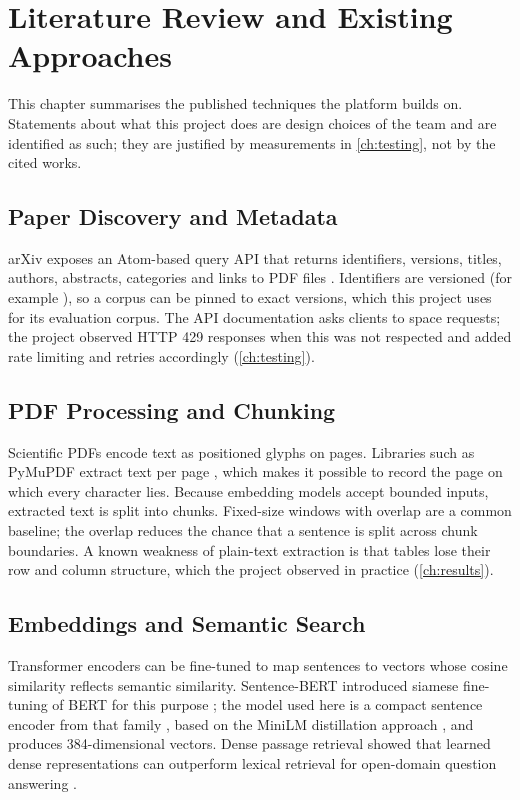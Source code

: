 \chapter{Literature Review and Existing Approaches}\label{ch:litreview}

This chapter summarises the published techniques the platform builds on. Statements about what this project does
are design choices of the team and are identified as such; they are justified by measurements in
\autoref{ch:testing}, not by the cited works.

\section{Paper Discovery and Metadata}

arXiv exposes an Atom-based query API that returns identifiers, versions, titles, authors, abstracts, categories and
links to PDF files \cite{arxivapi}. Identifiers are versioned (for example ), so a corpus can be
pinned to exact versions, which this project uses for its evaluation corpus. The API documentation asks clients to
space requests; the project observed HTTP 429 responses when this was not respected and added rate limiting and
retries accordingly (\autoref{ch:testing}).

\section{PDF Processing and Chunking}

Scientific PDFs encode text as positioned glyphs on pages. Libraries such as PyMuPDF extract text per page
\cite{pymupdf}, which makes it possible to record the page on which every character lies. Because embedding models
accept bounded inputs, extracted text is split into chunks. Fixed-size windows with overlap are a common baseline;
the overlap reduces the chance that a sentence is split across chunk boundaries. A known weakness of plain-text
extraction is that tables lose their row and column structure, which the project observed in practice
(\autoref{ch:results}).

\section{Embeddings and Semantic Search}

Transformer encoders \cite{vaswani2017attention,devlin2019bert} can be fine-tuned to map sentences to vectors
whose cosine similarity reflects semantic similarity. Sentence-BERT introduced siamese fine-tuning of BERT for this
purpose \cite{reimers2019sbert}; the  model used here is a compact sentence encoder from
that family \cite{minilmcard,sbertdocs}, based on the MiniLM distillation approach \cite{wang2020minilm}, and
produces 384-dimensional vectors. Dense passage retrieval showed that learned dense representations can outperform
lexical retrieval for open-domain question answering \cite{karpukhin2020dpr}.

